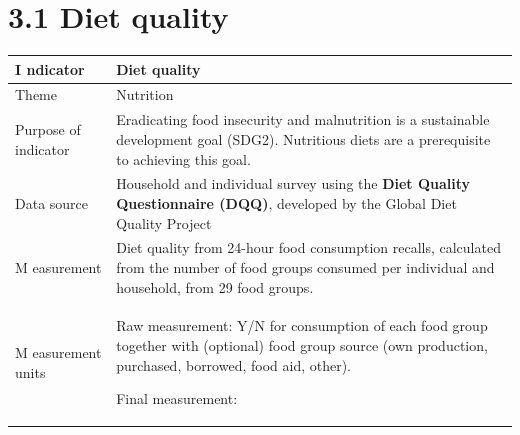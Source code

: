 \documentclass[
  letterpaper,
  DIV=11,
  numbers=noendperiod]{scrreprt}
\begin{document}
\chapter{3.1 Diet quality}\label{diet-quality}

\begin{longtable}[]{@{}
  >{\raggedright\arraybackslash}p{}
  >{\raggedright\arraybackslash}p{}@{}}
\toprule\noalign{}
\begin{minipage}[b]{\linewidth}\raggedright
\textbf{I ndicator}
\end{minipage} & \begin{minipage}[b]{\linewidth}\raggedright
\textbf{Diet quality}
\end{minipage} \\
\midrule\noalign{}
\endhead
\bottomrule\noalign{}
\endlastfoot
Theme & Nutrition \\
Purpose of indicator & Eradicating food insecurity and malnutrition is a
sustainable development goal (SDG2). Nutritious diets are a prerequisite
to achieving this goal. \\
Data source & Household and individual survey using the \textbf{Diet
Quality Questionnaire (DQQ)}, developed by the Global Diet Quality
Project \\
M easurement & Diet quality from 24-hour food consumption recalls,
calculated from the number of food groups consumed per individual and
household, from 29 food groups. \\
M easurement units & \begin{minipage}[t]{\linewidth}\raggedright
Raw measurement: Y/N for consumption of each food group together with
(optional) food group source (own production, purchased, borrowed, food
aid, other).

Final measurement:


\end{minipage}
\end{longtable}
\end{document}
